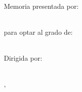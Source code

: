 \begin{titlepage}
\begin{addmargin}[-1cm]{-3cm}
    \begin{center}
        

        {} \\
	{}
 
 \bigskip

	\spacedallcaps{\myDepartment} \\ 
	\spacedlowsmallcaps{\myUni}


 \vspace{3.5cm}

        {\spacedallcaps{\textbf{\myTitle}}} \\
	{\spacedallcaps{\textbf{\mySubtitle}}} 


\vspace{5.5cm}

	{{\small Memoria presentada por:}} \\
        {\spacedlowsmallcaps{\myName}}  \\ 

\vspace{1.5cm}

        {\small para optar al grado de: }\normalsize\\
        \large\spacedlowsmallcaps{\myDegree}\\
\vspace{1.5cm}

{\small Dirigida por: }\normalsize\\
        \large\spacedlowsmallcaps{\mySupervisor}\\
 
\vspace{1.5cm}

        {\small \myLocation, \myTime}\\ \bigskip


    \end{center}
\end{addmargin}      
\end{titlepage}   
